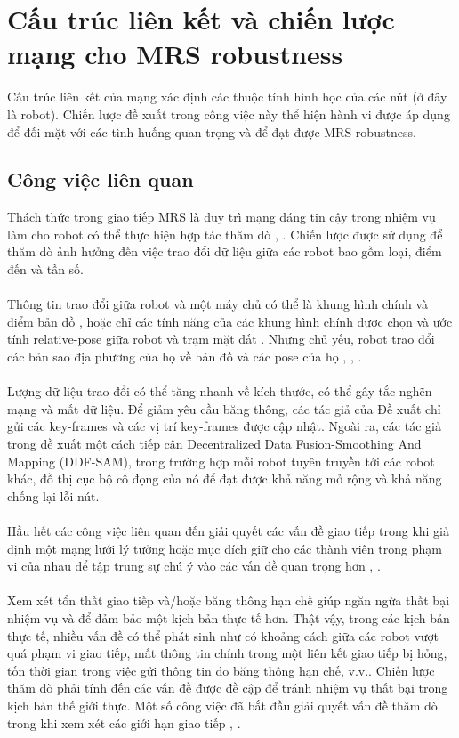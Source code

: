 \documentclass[11pt,openany]{book}
\begin{document}
\section{Cấu trúc liên kết và chiến lược mạng cho MRS robustness}
Cấu trúc liên kết của mạng xác định các thuộc tính hình học của các nút (ở đây là robot). Chiến lược đề xuất trong công việc này thể hiện hành vi được áp dụng để đối mặt với các tình huống quan trọng và để đạt được MRS robustness.
\subsection{Công việc liên quan}
Thách thức trong giao tiếp MRS là duy trì mạng đáng tin cậy trong nhiệm vụ làm cho robot có thể thực hiện hợp tác thăm dò \cite{rooker2007multi}, \cite{gupta2015survey}. Chiến lược được sử dụng để thăm dò ảnh hưởng đến việc trao đổi dữ liệu giữa các robot bao gồm loại, điểm đến và tần số.\\\\
Thông tin trao đổi giữa robot và một máy chủ có thể là khung hình chính và điểm bản đồ \cite{schmuck2017multi}, hoặc chỉ các tính năng của các khung hình chính được chọn và ước tính relative-pose giữa robot và trạm mặt đất \cite{forster2013collaborative}. Nhưng chủ yếu, robot trao đổi các bản sao địa phương của họ về bản đồ và các pose của họ \cite{fox2006distributed}, \cite{bresson2015general}, \cite{schuster2015multi}.\\\\
Lượng dữ liệu trao đổi có thể tăng nhanh về kích thước, có thể gây tắc nghẽn mạng và mất dữ liệu. Để giảm yêu cầu băng thông, các tác giả của \cite{mohanarajah2015cloud} Đề xuất chỉ gửi các key-frames và các vị trí key-frames được cập nhật. Ngoài ra, các tác giả trong \cite{cunningham2010ddf} đề xuất một cách tiếp cận Decentralized Data Fusion-Smoothing And Mapping (DDF-SAM), trong trường hợp mỗi robot tuyên truyền tới  các robot khác, đồ thị cục bộ cô đọng của nó để đạt được khả năng mở rộng và khả năng chống lại lỗi nút.\\\\
Hầu hết các công việc liên quan đến giải quyết các vấn đề giao tiếp trong khi giả định một mạng lưới lý tưởng hoặc mục đích giữ cho các thành viên trong phạm vi của nhau để tập trung sự chú ý vào các vấn đề quan trọng hơn \cite{scherer2015autonomous}, \cite{burgard2005coordinated}.\\\\
Xem xét tổn thất giao tiếp và/hoặc băng thông hạn chế giúp ngăn ngừa thất bại nhiệm vụ và để đảm bảo một kịch bản thực tế hơn. Thật vậy, trong các kịch bản thực tế, nhiều vấn đề có thể phát sinh như có khoảng cách giữa các robot vượt quá phạm vi giao tiếp, mất thông tin chính trong một liên kết giao tiếp bị hỏng, tốn thời gian trong việc gửi thông tin do băng thông hạn chế, v.v.. Chiến lược thăm dò phải tính đến các vấn đề được đề cập để tránh nhiệm vụ thất bại trong kịch bản thế giới thực. Một số công việc đã bắt đầu giải quyết vấn đề thăm dò trong khi xem xét các giới hạn giao tiếp \cite{couceiro2014darwinian}, \cite{schmuck2017multi}.\\\\
\end{document}
